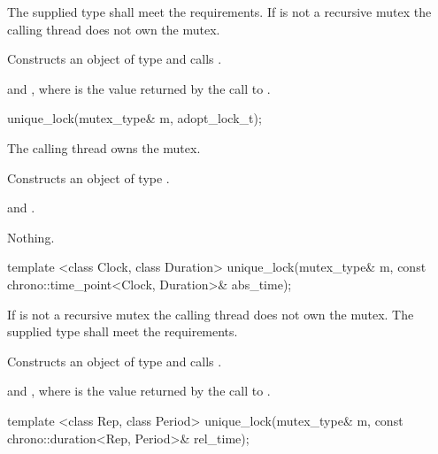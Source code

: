 \begin{itemdescr}
\pnum
\requires
The supplied  type shall meet the 
requirements.
If  is not a recursive mutex the calling thread does not own the mutex.

\pnum
\effects Constructs an object of type  and calls .

\pnum
\postconditions {} and ,
where  is the value returned by the call to .
\end{itemdescr}

%
\begin{itemdecl}
unique_lock(mutex_type& m, adopt_lock_t);
\end{itemdecl}

\begin{itemdescr}
\pnum
\requires The calling thread owns the mutex.

\pnum
\effects Constructs an object of type .

\pnum
\postconditions {} and .

\pnum
\throws Nothing.
\end{itemdescr}

%
\begin{itemdecl}
template <class Clock, class Duration>
  unique_lock(mutex_type& m, const chrono::time_point<Clock, Duration>& abs_time);
\end{itemdecl}

\begin{itemdescr}
\pnum
\requires If  is not a recursive mutex the calling thread
does not own the mutex. The supplied  type shall meet the
 requirements.

\pnum
\effects Constructs an object of type  and calls .

\pnum
\postconditions {} and ,
where  is
the value returned by the call to .
\end{itemdescr}

%
\begin{itemdecl}
template <class Rep, class Period>
  unique_lock(mutex_type& m, const chrono::duration<Rep, Period>& rel_time);
\end{itemdecl}

